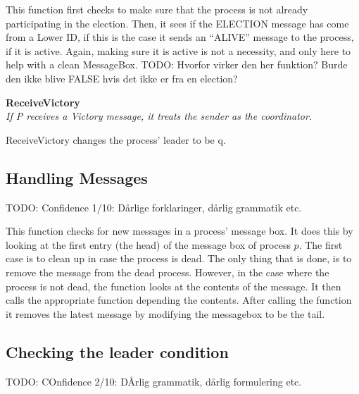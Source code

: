 \documentclass{article}
\begin{document}
This function first checks to make sure that the process is not already participating in the election. Then, it sees if the ELECTION message has come from a Lower ID, if this is the case it sends an ``ALIVE'' message to the process, if it is active. Again, making sure it is active is not a necessity, and only here to help with a clean MessageBox.
TODO: Hvorfor virker den her funktion? Burde den ikke blive FALSE hvis det ikke er fra en election?

\textbf{ReceiveVictory}\\
\textit{If P receives a Victory message, it treats the sender as the coordinator.}

ReceiveVictory changes the process' leader to be q.


\subsection{Handling Messages}
TODO: Confidence 1/10: Dårlige forklaringer, dårlig grammatik etc.

\noindent{}

This function checks for new messages in a process' message box. It does this by looking at the first entry (the head) of the message box of process $p$. The first case is to clean up in case the process is dead. The only thing that is done, is to remove the message from the dead process. However, in the case where the process is not dead, the function looks at the contents of the message. It then calls the appropriate function depending the contents. After calling the function it removes the latest message by modifying the messagebox to be the tail.

\subsection{Checking the leader condition}
TODO: COnfidence 2/10: DÅrlig grammatik, dårlig formulering etc.\\
\noindent{}
\end{document}
